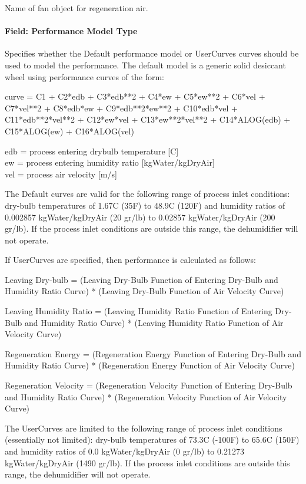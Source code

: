 Name of fan object for regeneration air.

\paragraph{Field: Performance Model Type}\label{field-performance-model-type}

Specifies whether the Default performance model or UserCurves curves should be used to model the performance. The default model is a generic solid desiccant wheel using performance curves of the form:

curve = C1 + C2*edb + C3*edb**2 + C4*ew + C5*ew**2 + C6*vel + C7*vel**2 + C8*edb*ew + C9*edb**2*ew**2 + C10*edb*vel + C11*edb**2*vel**2 + C12*ew*vel + C13*ew**2*vel**2 + C14*ALOG(edb) + C15*ALOG(ew) + C16*ALOG(vel)

edb = process entering drybulb temperature {[}C{]}\\
ew = process entering humidity ratio {[}kgWater/kgDryAir{]}\\
vel = process air velocity {[}m/s{]}

The Default curves are valid for the following range of process inlet conditions: dry-bulb temperatures of 1.67C (35F) to 48.9C (120F) and humidity ratios of 0.002857 kgWater/kgDryAir (20 gr/lb) to 0.02857 kgWater/kgDryAir (200 gr/lb). If the process inlet conditions are outside this range, the dehumidifier will not operate.

If UserCurves are specified, then performance is calculated as follows:

Leaving Dry-bulb = (Leaving Dry-Bulb Function of Entering Dry-Bulb and Humidity Ratio Curve) * (Leaving Dry-Bulb Function of Air Velocity Curve)

Leaving Humidity Ratio = (Leaving Humidity Ratio Function of Entering Dry-Bulb and Humidity Ratio Curve) * (Leaving Humidity Ratio Function of Air Velocity Curve)

Regeneration Energy = (Regeneration Energy Function of Entering Dry-Bulb and Humidity Ratio Curve) * (Regeneration Energy Function of Air Velocity Curve)

Regeneration Velocity = (Regeneration Velocity Function of Entering Dry-Bulb and Humidity Ratio Curve) * (Regeneration Velocity Function of Air Velocity Curve)

The UserCurves are limited to the following range of process inlet conditions (essentially not limited): dry-bulb temperatures of 73.3C (-100F) to 65.6C (150F) and humidity ratios of 0.0 kgWater/kgDryAir (0 gr/lb) to 0.21273 kgWater/kgDryAir (1490 gr/lb). If the process inlet conditions are outside this range, the dehumidifier will not operate.


